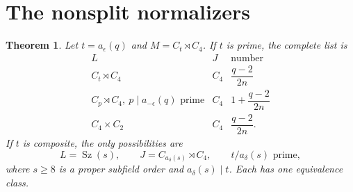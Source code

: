 \documentclass[11pt,a4paper]{article}
\newtheorem{theorem}{Theorem}
\newcommand{\Sz}{\operatorname{Sz}}
\begin{document}
\section{The nonsplit normalizers}
\begin{theorem}\label{nonsplit}
Let $t=a_\epsilon(q)$ and $M=C_t\rtimes C_4$. If $t$ is prime,
the complete list is
\[
\begin{array}{c|c|c}
 L&J&\text{number}\\\hline
 C_t\rtimes C_4&C_4&\dfrac{q-2}{2n}\\[2mm]
 C_p\rtimes C_4,\ p\mid a_{-\epsilon}(q)\text{ prime}
      &C_4&1+\dfrac{q-2}{2n}\\[2mm]
 C_4\times C_2&C_4&\dfrac{q-2}{2n}.
\end{array}                                               \tag{14}
\]
If $t$ is composite, the only possibilities are
\[
 L=\Sz(s),\qquad J=C_{a_\delta(s)}\rtimes C_4,
 \qquad t/a_\delta(s)\text{ prime},                       \tag{15}
\]
where $s\ge8$ is a proper subfield order and
$a_\delta(s)\mid t$. Each has one equivalence class.
\end{theorem}
\end{document}
